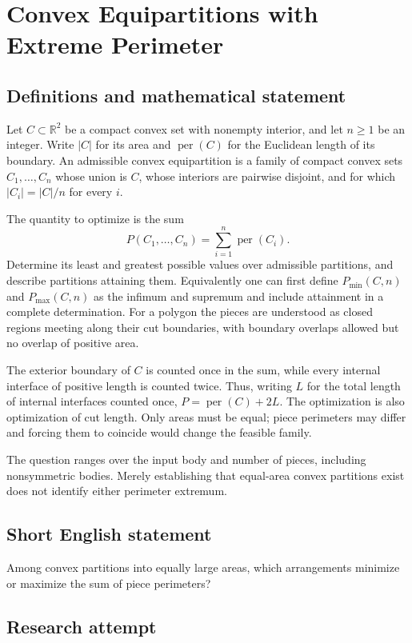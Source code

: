 \documentclass[11pt,a4paper]{article}
\begin{document}
\section*{Convex Equipartitions with Extreme Perimeter}\label{statement}

\subsection{Definitions and mathematical statement}
Let $C\subset\mathbb R^2$ be a compact convex set with nonempty interior,
and let $n\ge1$ be an integer. Write $|C|$ for its area and
$\operatorname{per}(C)$ for the Euclidean length of its boundary.
An admissible convex equipartition is a family of compact convex sets
$C_1,\ldots,C_n$ whose union is $C$, whose interiors are pairwise disjoint,
and for which $|C_i|=|C|/n$ for every $i$.

The quantity to optimize is the sum
\[
 P(C_1,\ldots,C_n)=\sum_{i=1}^n\operatorname{per}(C_i).
\]
Determine its least and greatest possible values over admissible partitions,
and describe partitions attaining them. Equivalently one can first define
$P_{\min}(C,n)$ and $P_{\max}(C,n)$ as the infimum and supremum and
include attainment in a complete determination. For a polygon the pieces
are understood as closed regions meeting along their cut boundaries,
with boundary overlaps allowed but no overlap of positive area.

The exterior boundary of $C$ is counted once in the sum, while every
internal interface of positive length is counted twice. Thus, writing
$L$ for the total length of internal interfaces counted once,
$P=\operatorname{per}(C)+2L$. The optimization is also optimization of
cut length. Only areas must be equal; piece perimeters may differ and
forcing them to coincide would change the feasible family.

The question ranges over the input body and number of pieces, including
nonsymmetric bodies. Merely establishing that equal-area convex partitions
exist does not identify either perimeter extremum.
\subsection{Short English statement}
Among convex partitions into equally large areas, which arrangements minimize or maximize the sum of piece perimeters?
\subsection{Research attempt}
\end{document}
